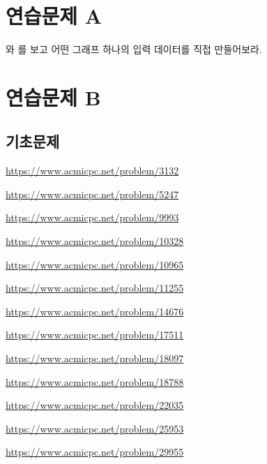 \section{연습문제 A}
\begin{problem}
    와 를 보고 어떤 그래프 하나의 입력 데이터를 직접 만들어보라.
\end{problem}

\section{연습문제 B}

\subsection{기초문제}
\begin{problem} \url{https://www.acmicpc.net/problem/3132} \end{problem}
\begin{problem} \url{https://www.acmicpc.net/problem/5247} \end{problem}
\begin{problem} \url{https://www.acmicpc.net/problem/9993} \end{problem}
\begin{problem} \url{https://www.acmicpc.net/problem/10328} \end{problem}
\begin{problem} \url{https://www.acmicpc.net/problem/10965} \end{problem}
\begin{problem} \url{https://www.acmicpc.net/problem/11255} \end{problem}
\begin{problem} \url{https://www.acmicpc.net/problem/14676} \end{problem}
\begin{problem} \url{https://www.acmicpc.net/problem/17511} \end{problem}
\begin{problem} \url{https://www.acmicpc.net/problem/18097} \end{problem}
\begin{problem} \url{https://www.acmicpc.net/problem/18788} \end{problem}
\begin{problem} \url{https://www.acmicpc.net/problem/22035} \end{problem}
\begin{problem} \url{https://www.acmicpc.net/problem/25953} \end{problem}
\begin{problem} \url{https://www.acmicpc.net/problem/29955} \end{problem}

